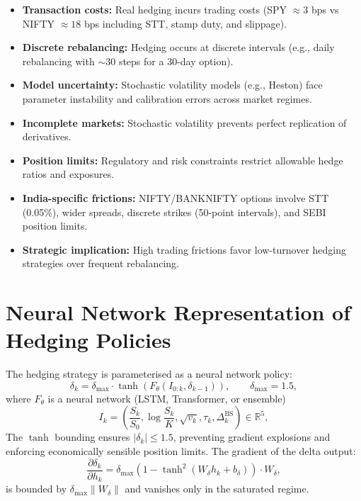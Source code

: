 \documentclass[11pt,oneside]{report}
\begin{document}
\begin{itemize}[noitemsep]
    \item \textbf{Transaction costs:} Real hedging incurs trading costs (SPY $\approx 3$ bps vs NIFTY $\approx 18$ bps including STT, stamp duty, and slippage).
    
    \item \textbf{Discrete rebalancing:} Hedging occurs at discrete intervals (e.g., daily rebalancing with $\sim 30$ steps for a 30-day option).
    
    \item \textbf{Model uncertainty:} Stochastic volatility models (e.g., Heston) face parameter instability and calibration errors across market regimes.
    
    \item \textbf{Incomplete markets:} Stochastic volatility prevents perfect replication of derivatives.
    
    \item \textbf{Position limits:} Regulatory and risk constraints restrict allowable hedge ratios and exposures.
    
    \item \textbf{India-specific frictions:} NIFTY/BANKNIFTY options involve STT (0.05\%), wider spreads, discrete strikes (50-point intervals), and SEBI position limits.
    
    \item \textbf{Strategic implication:} High trading frictions favor low-turnover hedging strategies over frequent rebalancing.
\end{itemize}

\section{Neural Network Representation of Hedging Policies}

The hedging strategy is parameterised as a neural network policy:
\begin{equation}
    \delta_k = \delta_{\max} \cdot \tanh(F_\theta(I_{0:k}, \delta_{k-1})), \qquad \delta_{\max} = 1.5,
\end{equation}
where $F_\theta$ is a neural network (LSTM, Transformer, or ensemble) \begin{equation}
I_k = \left(\frac{S_k}{S_0}, \log\frac{S_k}{K}, \sqrt{v_k}, \tau_k, \Delta_k^{\mathrm{BS}}\right) \in \mathbb{R}^5,
\end{equation} The $\tanh$ bounding ensures $|\delta_k| \leq 1.5$, preventing gradient explosions and enforcing economically sensible position limits. The gradient of the delta output:
\begin{equation}
    \frac{\partial \delta_k}{\partial h_k} = \delta_{\max}(1 - \tanh^2(W_\delta h_k + b_\delta)) \cdot W_\delta,
\end{equation}
is bounded by $\delta_{\max}\|W_\delta\|$ and vanishes only in the saturated regime.
\end{document}
